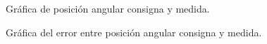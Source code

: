 \documentclass[a4paper, 10pt, onecolumn,journal]{ieeeconf}
\begin{document}
\begin{figure}[H]
	\centering
	\begin{adjustbox}{scale=0.5,max width=\columnwidth}
	\end{adjustbox}
	\caption{Gráfica de posición angular consigna y medida.}
	\label{Grafica de posicion angular consigna y medida }
\end{figure}
\begin{figure}[H]
	\centering
	\begin{adjustbox}{scale=0.5,max width=\columnwidth}
	\end{adjustbox}
	\caption{Gráfica del error entre posición angular consigna y medida.}
	\label{Grafica del error entre posicion angular consigna y medida }
\end{figure}
\end{document}
